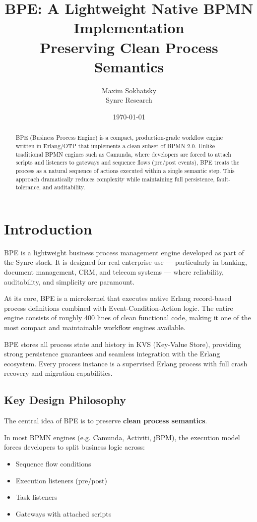 \documentclass[11pt,a4paper]{article}
\title{BPE: A Lightweight Native BPMN Implementation \\
Preserving Clean Process Semantics}
\author{Maxim Sokhatsky \\ Synrc Research}
\date{\today}
\begin{document}
\maketitle

\begin{abstract}
BPE (Business Process Engine) is a compact, production-grade workflow engine written in Erlang/OTP
that implements a clean subset of BPMN 2.0. Unlike traditional BPMN engines such as Camunda,
where developers are forced to attach scripts and listeners to gateways and sequence flows (pre/post events),
BPE treats the process as a natural sequence of actions executed within a single semantic step.
This approach dramatically reduces complexity while maintaining full persistence, fault-tolerance, and auditability.
\end{abstract}

\newpage
\tableofcontents

\newpage
\section{Introduction}

BPE is a lightweight business process management engine developed as part of the Synrc stack.
It is designed for real enterprise use — particularly in banking, document management, CRM,
and telecom systems — where reliability, auditability, and simplicity are paramount.

At its core, BPE is a microkernel that executes native Erlang record-based process definitions
combined with Event-Condition-Action logic. The entire engine consists of roughly 400 lines of
clean functional code, making it one of the most compact and maintainable workflow engines available.

BPE stores all process state and history in KVS (Key-Value Store), providing strong persistence
guarantees and seamless integration with the Erlang ecosystem. Every process instance is a
supervised Erlang process with full crash recovery and migration capabilities.

\subsection{Key Design Philosophy}

The central idea of BPE is to preserve \textbf{clean process semantics}.

In most BPMN engines (e.g. Camunda, Activiti, jBPM), the execution model forces developers to split business logic across:
\begin{itemize}
    \item Sequence flow conditions
    \item Execution listeners (pre/post)
    \item Task listeners
    \item Gateways with attached scripts
\end{itemize}
\end{document}
